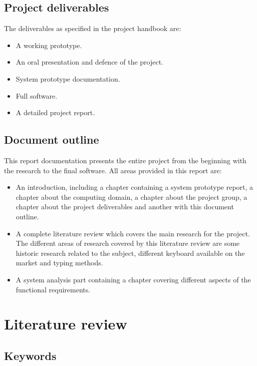 \chapter{Project deliverables}
The deliverables as specified in the project handbook are:
\begin{itemize}
\item A working prototype.
\item An oral presentation and defence of the project.
\item System prototype documentation.
\item Full software.
\item A detailed project report.
\end{itemize}

\chapter{Document outline}
This report documentation presents the entire project from the beginning with the research to the final software.
All areas provided in this report are:
\begin{itemize}
\item An introduction, including a chapter containing a system prototype report, a chapter about the computing domain, a chapter about the project group, a chapter about the project deliverables and another with this document outline.
\item A complete literature review which covers the main research for the project. The different areas of research covered by this literature review are some historic research related to the subject, different keyboard available on the market and typing methods.  
\item A system analysis part containing a chapter covering different aspects of the functional requirements. 
\end{itemize}

\part{Literature review}
%
\chapter*{Keywords}
\begin{sortedlist}
\end{sortedlist}


